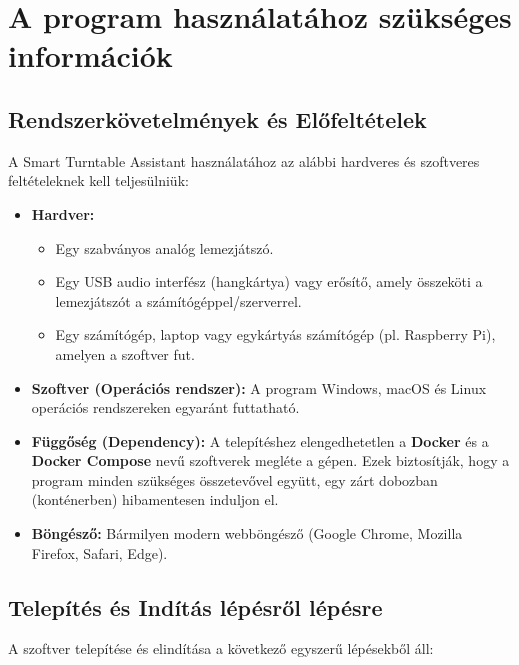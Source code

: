 \section{A program használatához szükséges információk}

\subsection{Rendszerkövetelmények és Előfeltételek}
A Smart Turntable Assistant használatához az alábbi hardveres és szoftveres feltételeknek kell teljesülniük:
\begin{itemize}
    \item \textbf{Hardver:} 
    \begin{itemize}
        \item Egy szabványos analóg lemezjátszó.
        \item Egy USB audio interfész (hangkártya) vagy erősítő, amely összeköti a lemezjátszót a számítógéppel/szerverrel.
        \item Egy számítógép, laptop vagy egykártyás számítógép (pl. Raspberry Pi), amelyen a szoftver fut.
    \end{itemize}
    \item \textbf{Szoftver (Operációs rendszer):} A program Windows, macOS és Linux operációs rendszereken egyaránt futtatható.
    \item \textbf{Függőség (Dependency):} A telepítéshez elengedhetetlen a \textbf{Docker} és a \textbf{Docker Compose} nevű szoftverek megléte a gépen. Ezek biztosítják, hogy a program minden szükséges összetevővel együtt, egy zárt dobozban (konténerben) hibamentesen induljon el.
    \item \textbf{Böngésző:} Bármilyen modern webböngésző (Google Chrome, Mozilla Firefox, Safari, Edge).
\end{itemize}

\subsection{Telepítés és Indítás lépésről lépésre}
A szoftver telepítése és elindítása a következő egyszerű lépésekből áll:

